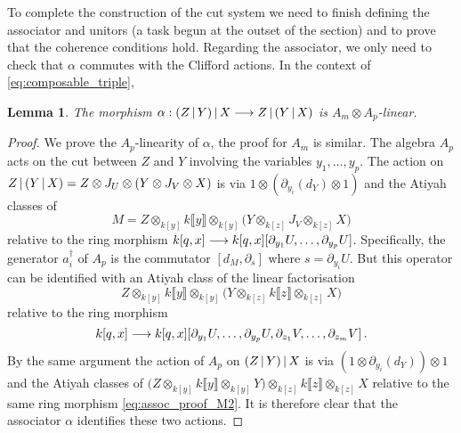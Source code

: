 \documentclass[english,letter paper,12pt,leqno]{article}
\newtheorem{lemma}[theorem]{Lemma}
\theoremstyle{example}
\numberwithin{equation}{section}
\begin{document}
To complete the construction of the cut system we need to finish defining the associator and unitors (a task begun at the outset of the section) and to prove that the coherence conditions hold. Regarding the associator, we only need to check that $\alpha$ commutes with the Clifford actions. In the context of \eqref{eq:composable_triple},

\begin{lemma} The morphism $\alpha: (Z \,|\, Y) \,|\, X \longrightarrow Z \,|\, (Y \,|\, X)$ is $A_m \otimes A_p$-linear.
\end{lemma}
\begin{proof}
We prove the $A_p$-linearity of $\alpha$, the proof for $A_m$ is similar. The algebra $A_p$ acts on the cut between $Z$ and $Y$ involving the variables $y_1,\ldots,y_p$. The action on $Z \,|\, ( Y \,|\, X ) = Z \otimes J_U \otimes (Y \otimes J_V \otimes X)$ is via $1 \otimes (\partial_{y_i}(d_Y) \otimes 1)$ and the Atiyah classes of 
\[
M = Z \otimes_{k[y]} k\llbracket y \rrbracket \otimes_{k[y]} \big( Y \otimes_{k[z]} J_V \otimes_{k[z]} X \big)
\]
relative to the ring morphism $k[q,x] \longrightarrow k[q,x] [ \partial_{y_1} U, \ldots, \partial_{y_p} U ]$. Specifically, the generator $a_i^{\dagger}$ of $A_p$ is the commutator $[d_{M}, \partial_s]$ where $s = \partial_{y_i} U$. But this operator can be identified with an Atiyah class of the linear factorisation
\begin{equation}\label{eq:assoc_proof_M}
Z \otimes_{k[y]} k\llbracket y \rrbracket \otimes_{k[y]} \big( Y \otimes_{k[z]} k\llbracket z \rrbracket \otimes_{k[z]} X \big)
\end{equation}
relative to the ring morphism
\begin{equation}\label{eq:assoc_proof_M2}
k[q,x] \longrightarrow k[q,x] [ \partial_{y_1} U, \ldots, \partial_{y_p} U, \partial_{z_1} V, \ldots, \partial_{z_m} V ]\,.
\end{equation}
By the same argument the action of $A_p$ on $(Z \,|\, Y ) \,|\, X$ is via $(1 \otimes \partial_{y_i}(d_Y)) \otimes 1$ and the Atiyah classes of $\big( Z \otimes_{k[y]} k\llbracket y \rrbracket \otimes_{k[y]} Y \big) \otimes_{k[z]} k\llbracket z \rrbracket \otimes_{k[z]} X$ relative to the same ring morphism \eqref{eq:assoc_proof_M2}. It is therefore clear that the associator $\alpha$ identifies these two actions.
\end{proof}
\end{document}

